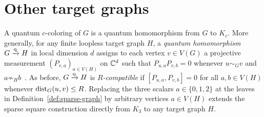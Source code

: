 \section{Other target graphs}\label{sec:targets}

A quantum $c$-coloring of $G$ is a quantum homomorphism from $G$ to $K_c$. More generally, for any finite loopless target graph $H$, a \emph{quantum homomorphism} $G\xrightarrow{\mathrm q} H$ in local dimension $d$ assigns to each vertex $v\in V(G)$ a projective measurement $(P_{v,a})_{a\in V(H)}$ on $\mathbb C^d$ such that $P_{u,a}P_{v,b}=0$ whenever $u\sim_G v$ and $a\not\sim_H b$~\cite[Corollary~2.2]{MR}. As before, $G\xrightarrow{\mathrm q} H$ is \emph{$R$-compatible} if $[P_{u,a},P_{v,b}]=0$ for all $a,b\in V(H)$ whenever $\operatorname{dist}_G(u,v)\le R$. Replacing the three scalars $a\in\{0,1,2\}$ at the leaves in Definition~\ref{def:sparse-graph} by arbitrary vertices $a\in V(H)$ extends the sparse square construction directly from $K_3$ to any target graph $H$.

